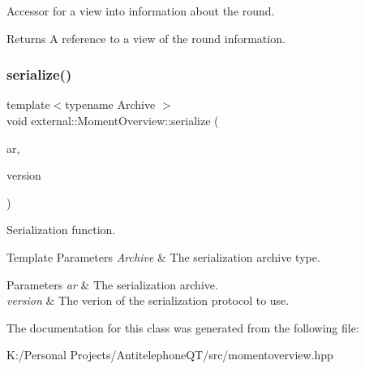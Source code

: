 Accessor for a view into information about the round. 

\begin{DoxyReturn}{Returns}
A reference to a view of the round information. 
\end{DoxyReturn}
\mbox{\label{classexternal_1_1_moment_overview_a5791e663d0c7be6c1a19b0b7af416855}} 
\subsubsection{\texorpdfstring{serialize()}{serialize()}}
{\footnotesize\ttfamily template$<$typename Archive $>$ \\
void external\+::\+Moment\+Overview\+::serialize (\begin{DoxyParamCaption}\item[{Archive \&}]{ar,  }\item[{unsigned int const}]{version }\end{DoxyParamCaption})\hspace{0.3cm}{\ttfamily [inline]}}



Serialization function. 


\begin{DoxyTemplParams}{Template Parameters}
{\em Archive} & The serialization archive type. \\
\hline
\end{DoxyTemplParams}

\begin{DoxyParams}{Parameters}
{\em ar} & The serialization archive. \\
\hline
{\em version} & The verion of the serialization protocol to use. \\
\hline
\end{DoxyParams}


The documentation for this class was generated from the following file\+:\begin{DoxyCompactItemize}
\item 
K\+:/\+Personal Projects/\+Antitelephone\+Q\+T/src/momentoverview.\+hpp\end{DoxyCompactItemize}
